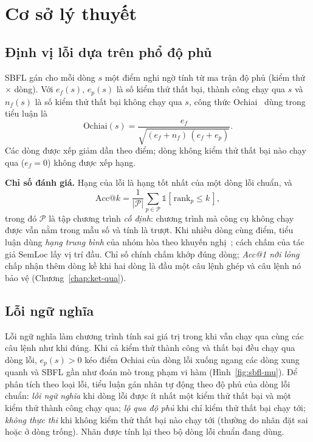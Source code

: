 \chapter{Cơ sở lý thuyết}
\label{chap:co-so}

\section{Định vị lỗi dựa trên phổ độ phủ}
\label{sec:sbfl}

SBFL gán cho mỗi dòng $s$ một điểm nghi ngờ tính từ ma trận độ phủ (kiểm thử $\times$ dòng). Với $e_f(s)$, $e_p(s)$
là số kiểm thử thất bại, thành công chạy qua $s$ và $n_f(s)$ là số kiểm thử thất bại không chạy qua $s$, công thức
Ochiai~\cite{abreu2009} dùng trong tiểu luận là
\begin{equation} \mathrm{Ochiai}(s) = \frac{e_f}{\sqrt{(e_f+n_f)\,(e_f+e_p)}}. \label{eq:ochiai} \end{equation}
Các dòng được xếp giảm dần theo điểm; dòng không kiểm thử thất bại nào chạy qua ($e_f = 0$) không được xếp hạng.

\textbf{Chỉ số đánh giá.} Hạng của lỗi là hạng tốt nhất của một dòng lỗi chuẩn, và
\begin{equation} \mathrm{Acc@}k = \frac{1}{|\mathcal{P}|} \sum_{p \in \mathcal{P}} \mathbb{1}\!\left[\,\mathrm{rank}_p \le k\,\right], \label{eq:acck} \end{equation}
trong đó $\mathcal{P}$ là tập chương trình \emph{cố định}: chương trình mà công cụ không chạy được vẫn nằm trong mẫu số
và tính là trượt. Khi nhiều dòng cùng điểm, tiểu luận dùng \emph{hạng trung bình} của nhóm hòa theo khuyến
nghị~\cite{pearson2017,desouza2016}; cách chấm của tác giả SemLoc lấy vị trí đầu. Chỉ số chính chấm khớp đúng dòng;
\emph{Acc@1 nới lỏng} chấp nhận thêm dòng kề khi hai dòng là đầu một câu lệnh ghép và câu lệnh nó bảo vệ
(Chương~\ref{chap:ket-qua}).

\section{Lỗi ngữ nghĩa}
\label{sec:loi-ngu-nghia}

Lỗi ngữ nghĩa làm chương trình tính sai giá trị trong khi vẫn chạy qua cùng các câu lệnh như khi đúng. Khi cả
kiểm thử thành công và thất bại đều chạy qua dòng lỗi, $e_p(s) > 0$ kéo điểm Ochiai của dòng lỗi xuống ngang các dòng
xung quanh và SBFL gần như đoán mò trong phạm vi hàm (Hình~\ref{fig:sbfl-mu}). Để phân tích theo loại lỗi, tiểu luận gán nhãn tự động theo độ phủ của dòng lỗi chuẩn:
\emph{lỗi ngữ nghĩa} khi dòng lỗi được ít nhất một kiểm thử thất bại và một kiểm thử thành công chạy qua;
\emph{lộ qua độ phủ} khi chỉ kiểm thử thất bại chạy tới; \emph{không thực thi} khi không kiểm thử thất bại nào chạy tới
(thường do nhãn đặt sai hoặc ở dòng trống). Nhãn được tính lại theo bộ dòng lỗi chuẩn đang dùng.


